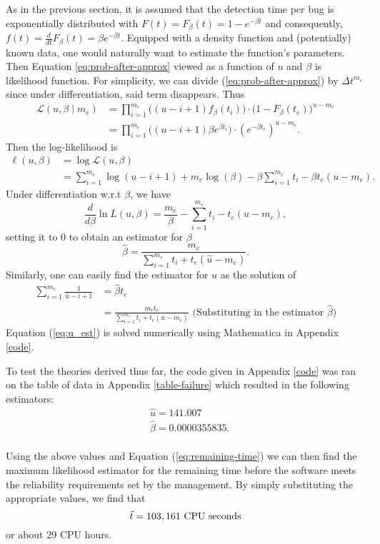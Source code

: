 As in the previous section, it is assumed that the detection time per bug is exponentially distributed with $F(t) = F_{\beta}(t) = 1 - e^{-\beta t}$ and consequently, $f(t) = \frac{d}{dt} F_{\beta}(t) =  \beta e^{-\beta t}.$ Equipped with a density function and (potentially) known data, one would naturally want to estimate the function's parameters. Then Equation \ref{eq:prob-after-approx} viewed as a function of $u$ and $\beta$ is likelihood function. For simplicity, we can divide (\ref{eq:prob-after-approx}) by $\Delta t^{m_e}$ since under differentiation, said term disappears. Thus
\begin{align*}
    \mathcal{L}(u,\beta\mid m_e)&=\prod_{i=1}^{m_e}\big((u-i + 1)f_{\beta}(t_i)\big) \cdot \big(1 - F_{\beta}(t_e)\big)^{u-m_e}\\    
    & = \prod_{i=1}^{m_e}\big((u-i + 1)\beta e^{\beta t_i}\big) \cdot \left(e^{-\beta t_e}\right)^{u-m_e}.
\end{align*}
Then the log-likelihood is
\begin{align*}
    \ell(u,\beta) &= \log{\mathcal{L}(u,\beta)}\\
    &= \sum_{i=1}^{m_e} \log{(u-i+1)} + m_e \log{(\beta)} - \beta \sum_{i=1}^{m_e}t_i - \beta t_e(u-m_e).
\end{align*}
Under differentiation w.r.t $\beta$, we have 
\begin{equation*}
    \frac{d}{d\beta} \ln{L(u,\beta)}= \frac{m_e}{\beta} - \sum_{i=1}^{m_e}t_i - t_e(u-m_e), 
\end{equation*}
setting it to 0 to obtain an estimator for $\beta$
\begin{equation*}
    \hat{\beta} = \frac{m_e}{\sum_{i=1}^{m_e} t_i + t_e(\hat{u} - m_e)}.
\end{equation*}
Similarly, one can easily find the estimator for $u$ as the solution of 
\begin{equation}\label{eq:u_est}
    \begin{aligned}
        \sum_{i=1}^{m_e}\frac{1}{\hat{u} - i + 1} &= \hat{\beta} t_e\\
        &= \frac{m_e t_e}{\sum_{i=1}^{m_e} t_i + t_e(\hat{u} - m_e)} \text{  (Substituting in the estimator $\hat{\beta}$)}
    \end{aligned}
\end{equation}
Equation (\ref{eq:u_est}) is solved numerically using Mathematica in Appendix \ref{code}. 

To test the theories derived thus far, the code given in Appendix \ref{code} was ran on the table of data in Appendix \ref{table-failure} which resulted in the following estimators: 
\begin{align*}
    &\hat{u}=141.007\\
    &\hat{\beta}=0.0000355835. 
\end{align*} \\ 
Using the above values and Equation (\ref{eq:remaining-time}) we can then find the maximum likelihood estimator for the remaining time before the software meets the reliability requirements set by the management. By simply substituting the appropriate values, we find that
$$
\Tilde{t} = 103,161 \text{ CPU seconds}
$$
or about 29 CPU hours. 
